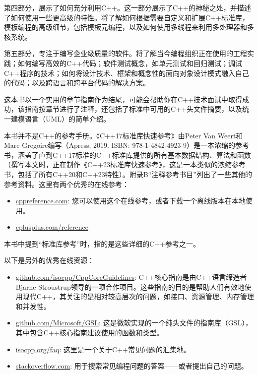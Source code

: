第四部分，展示了如何充分利用C++。这一部分展示了C++的神秘之处，并描述了如何使用一些更高级的特性。将了解如何根据需要自定义和扩展C++标准库，模板编程的高级细节，包括模板元编程，以及如何使用多线程来利用多处理器和多核系统。

第五部分，专注于编写企业级质量的软件。将了解当今编程组织正在使用的工程实践；如何编写高效的C++代码；软件测试概念，如单元测试和回归测试；调试C++程序的技术；如何将设计技术、框架和概念性的面向对象设计模式融入自己的代码；以及跨语言和跨平台代码的解决方案。

这本书以一个实用的章节指南作为结尾，可能会帮助你在C++技术面试中取得成功，该指南按章节进行了注释，还包括了标准中可用的C++头文件摘要，以及统一建模语言（UML）的简单介绍。

本书并不是C++的参考手册。《C++17标准库快速参考》由Peter Van Weert和Marc Gregoire编写（Apress, 2019. ISBN: 978-1-4842-4923-9）是一本浓缩的参考书，涵盖了直到C++17标准的C++标准库提供的所有基本数据结构、算法和函数（撰写本文时，正在制作《C++23标准库快速参考》，这是一本类似的浓缩参考书，包括了所有C++20和C++23特性）。附录B“注释参考书目”列出了一些其他的参考资料。这里有两个优秀的在线参考：

\begin{itemize}
\item
\url{cppreference.com}: 您可以使用这个在线参考，或者下载一个离线版本在本地使用。

\item
\url{cplusplus.com/reference}
\end{itemize}

本书中提到“标准库参考”时，指的是这些详细的C++参考之一。

以下是另外的优秀在线资源：

\begin{itemize}
\item
\url{github.com/isocpp/CppCoreGuidelines}: C++核心指南是由C++语言缔造者Bjarne Stroustrup领导的一项合作项目。这些指南的目的是帮助人们有效地使用现代C++，其关注的是相对较高层次的问题，如接口、资源管理、内存管理和并发性。

\item
\url{github.com/Microsoft/GSL}: 这是微软实现的一个纯头文件的指南库（GSL），其中包含C++核心指南建议使用的函数和类型。

\item
\url{isocpp.org/faq}: 这里是一个关于C++常见问题的汇集地。

\item
\url{stackoverflow.com}: 用于搜索常见编程问题的答案——或者提出自己的问题。
\end{itemize}

